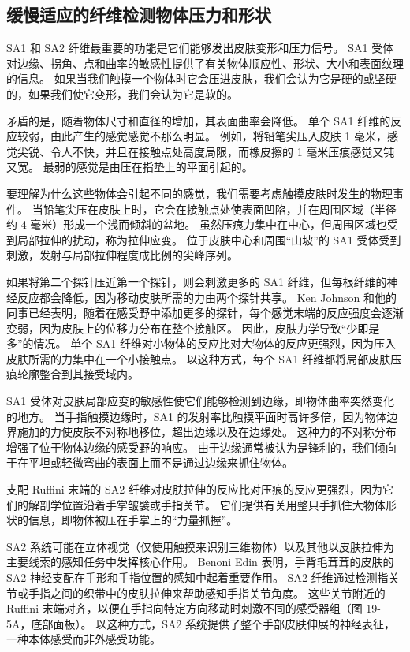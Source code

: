\subsection{缓慢适应的纤维检测物体压力和形状}

SA1 和 SA2 纤维最重要的功能是它们能够发出皮肤变形和压力信号。 SA1 受体对边缘、拐角、点和曲率的敏感性提供了有关物体顺应性、形状、大小和表面纹理的信息。 如果当我们触摸一个物体时它会压进皮肤，我们会认为它是硬的或坚硬的，如果我们使它变形，我们会认为它是软的。

矛盾的是，随着物体尺寸和直径的增加，其表面曲率会降低。 单个 SA1 纤维的反应较弱，由此产生的感觉感觉不那么明显。 例如，将铅笔尖压入皮肤 1 毫米，感觉尖锐、令人不快，并且在接触点处高度局限，而橡皮擦的 1 毫米压痕感觉又钝又宽。 最弱的感觉是由压在指垫上的平面引起的。

要理解为什么这些物体会引起不同的感觉，我们需要考虑触摸皮肤时发生的物理事件。 当铅笔尖压在皮肤上时，它会在接触点处使表面凹陷，并在周围区域（半径约 4 毫米）形成一个浅而倾斜的盆地。 虽然压痕力集中在中心，但周围区域也受到局部拉伸的扰动，称为拉伸应变。 位于皮肤中心和周围“山坡”的 SA1 受体受到刺激，发射与局部拉伸程度成比例的尖峰序列。

如果将第二个探针压近第一个探针，则会刺激更多的 SA1 纤维，但每根纤维的神经反应都会降低，因为移动皮肤所需的力由两个探针共享。 Ken Johnson 和他的同事已经表明，随着在感受野中添加更多的探针，每个感觉末端的反应强度会逐渐变弱，因为皮肤上的位移力分布在整个接触区。 因此，皮肤力学导致“少即是多”的情况。 单个 SA1 纤维对小物体的反应比对大物体的反应更强烈，因为压入皮肤所需的力集中在一个小接触点。 以这种方式，每个 SA1 纤维都将局部皮肤压痕轮廓整合到其接受域内。

SA1 受体对皮肤局部应变的敏感性使它们能够检测到边缘，即物体曲率突然变化的地方。 当手指触摸边缘时，SA1 的发射率比触摸平面时高许多倍，因为物体边界施加的力使皮肤不对称地移位，超出边缘以及在边缘处。 这种力的不对称分布增强了位于物体边缘的感受野的响应。 由于边缘通常被认为是锋利的，我们倾向于在平坦或轻微弯曲的表面上而不是通过边缘来抓住物体。

支配 Ruffini 末端的 SA2 纤维对皮肤拉伸的反应比对压痕的反应更强烈，因为它们的解剖学位置沿着手掌皱襞或手指关节。 它们提供有关用整只手抓住大物体形状的信息，即物体被压在手掌上的“力量抓握”。

SA2 系统可能在立体视觉（仅使用触摸来识别三维物体）以及其他以皮肤拉伸为主要线索的感知任务中发挥核心作用。 Benoni Edin 表明，手背毛茸茸的皮肤的 SA2 神经支配在手形和手指位置的感知中起着重要作用。 SA2 纤维通过检测指关节或手指之间的织带中的皮肤拉伸来帮助感知手指关节角度。 这些关节附近的 Ruffini 末端对齐，以便在手指向特定方向移动时刺激不同的感受器组（图 19-5A，底部面板）。 以这种方式，SA2 系统提供了整个手部皮肤伸展的神经表征，一种本体感受而非外感受功能。

